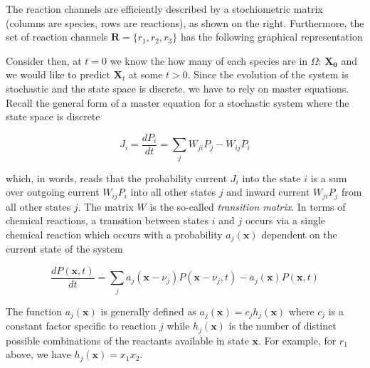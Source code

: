 \documentclass{article}
\begin{document}
The reaction channels are efficiently described by a stochiometric matrix (columns are species, rows are reactions), as shown on the right. Furthermore, the set of reaction channels $\mathbf{R} =  \{r_{1},r_{2},r_{3}\}$ has the following graphical representation

\begin{center}
\end{center}

Consider then, at $t=0$ we know the how many of each species are in $\Omega$: $\mathbf{X_{0}}$ and we would like to predict $\mathbf{X}_{t}$ at some $t > 0$. Since the evolution of the system is stochastic and the state space is discrete, we have to rely on master equations. Recall the general form of a master equation for a stochastic system where the state space is discrete

\begin{equation*}
J_{i} = \frac{dP_{i}}{dt} = \sum_{j} W_{ji}P_{j} - W_{ij}P_{i}
\end{equation*}

which, in words, reads that the probability current $J_{i}$ into the state $i$ is a sum over outgoing current $W_{ij}P_{i}$ into all other states $j$ and inward current $W_{ji}P_{j}$ from all other states $j$. The matrix $W$ is the so-called \emph{transition matrix}. In terms of chemical reactions, a transition between states $i$ and $j$ occurs via a single chemical reaction which occurs with a probability $a_{j}(\mathbf{x})$ dependent on the current state of the system

\begin{equation*}
\frac{dP(\mathbf{x},t)}{dt} = \sum_{j} a_{j}(\mathbf{x}-\nu_{j})P(\mathbf{x}-\nu_{j},t) - a_{j}(\mathbf{x})P(\mathbf{x},t)
\end{equation*}

The function $a_{j}(\mathbf{x})$ is generally defined as $a_{j}(\mathbf{x}) = c_{j}h_{j}(\mathbf{x})$ where $c_{j}$ is a constant factor specific to reaction $j$ while $h_{j}(\mathbf{x})$ is the number of distinct possible combinations of the reactants available in state $\mathbf{x}$. For example, for $r_{1}$ above, we have $h_{j}(\mathbf{x}) = x_{1}x_{2}$.
\end{document}
